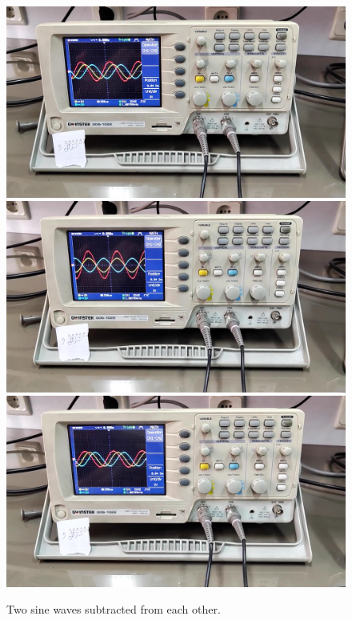 \documentclass[11pt]{article}
\newcommand{\PicScale}{0.2}
\begin{document}
\begin{question}
{        \begin{figure}[H]
            \begin{center}
                \includegraphics[scale=\PicScale]{Fig/27.png}
                \includegraphics[scale=\PicScale]{Fig/28.png}
                \includegraphics[scale=\PicScale]{Fig/29.png}
                \caption{Two sine waves subtracted from each other.}
            \end{center}
        \end{figure}

    }

\end{question}
\end{document}
